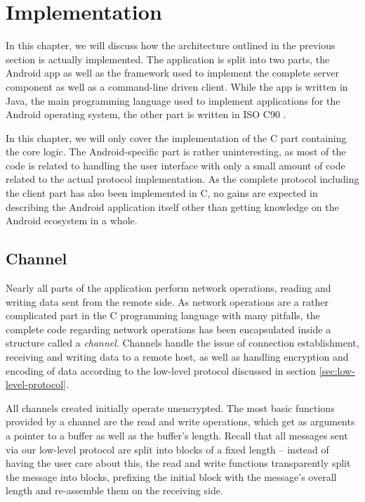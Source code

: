 \chapter{Implementation}

In this chapter, we will discuss how the architecture outlined in the previous section is actually implemented.
The application is split into two parts, the Android app as well as the framework used to implement the complete server component as well as a command-line driven client.
While the app is written in Java, the main programming language used to implement applications for the Android operating system, the other part is written in ISO C90 \cite{iso-c90}.

In this chapter, we will only cover the implementation of the C part containing the core logic.
The Android-specific part is rather uninteresting, as most of the code is related to handling the user interface with only a small amount of code related to the actual protocol implementation.
As the complete protocol including the client part has also been implemented in C, no gains are expected in describing the Android application itself other than getting knowledge on the Android ecosystem in a whole.

\section{Channel}
\label{sec:channel}

Nearly all parts of the application perform network operations, reading and writing data sent from the remote side.
As network operations are a rather complicated part in the C programming language with many pitfalls, the complete code regarding network operations has been encapsulated inside a structure called a \emph{channel}.
Channels handle the issue of connection establishment, receiving and writing data to a remote host, as well as handling encryption and encoding of data according to the low-level protocol discussed in section \ref{sec:low-level-protocol}.

All channels created initially operate unencrypted.
The most basic functions provided by a channel are the read and write operations, which get as arguments a pointer to a buffer as well as the buffer's length.
Recall that all messages sent via our low-level protocol are split into blocks of a fixed length -- instead of having the user care about this, the read and write functions transparently split the message into blocks, prefixing the initial block with the message's overall length and re-assemble them on the receiving side.

